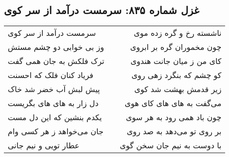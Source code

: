\begin{center}
\section*{غزل شماره ۸۳۵: سرمست درآمد از سر کوی}
\label{sec:835}
\begin{longtable}{l p{0.5cm} r}
سرمست درآمد از سر کوی
&&
ناشسته رخ و گره زده موی
\\
وز بی خوابی دو چشم مستش
&&
چون مخموران گره بر ابروی
\\
ترک فلکش به جان همی گفت
&&
کای من ز میان جانت هندوی
\\
فریاد کنان فلک که احسنت
&&
کو چشم که بنگرد زهی روی
\\
پیش لبش آب خضر شد خاک
&&
زیر قدمش بهشت شد کوی
\\
دل زار به های های بگریست
&&
می‌گفت به های های کای هوی
\\
یکدم بنشین که این دل مست
&&
چون باد همی رود به هر سوی
\\
جان می‌خواهد ز هر کسی وام
&&
بر روی تو می‌دهد به صد روی
\\
عطار تویی و نیم جانی
&&
با دوست به نیم جان سخن گوی
\\
\end{longtable}
\end{center}
